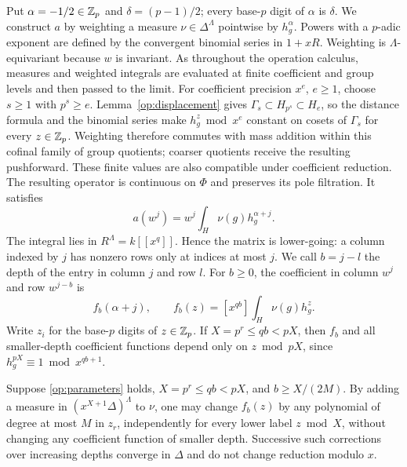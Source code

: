 Put $\alpha=-1/2\in\mathbb Z_p$ and $\delta=(p-1)/2$; every base-$p$ digit of
$\alpha$ is $\delta$. We construct $a$ by weighting a measure
$\nu\in\Delta^\Lambda$ pointwise by $h_g^\alpha$. Powers with a
$p$-adic exponent are defined by the convergent binomial series in
$1+xR$. Weighting is $\Lambda$-equivariant because $w$ is invariant.
As throughout the operation calculus, measures and weighted integrals
are evaluated at finite coefficient and group levels and then passed
to the limit. For coefficient precision $x^e$, $e\ge1$, choose
$s\ge1$ with $p^s\ge e$. Lemma~\ref{op:displacement} gives
$\Gamma_s\subset H_{p^s}\subset H_e$, so the distance formula and
the binomial series make $h_g^z\bmod x^e$ constant on cosets of
$\Gamma_s$ for every $z\in\mathbb Z_p$. Weighting therefore commutes with
mass addition within this cofinal family of group quotients; coarser
quotients receive the resulting pushforward. These finite values are
also compatible under coefficient reduction. The resulting operator
is continuous on $\Phi$ and preserves its pole filtration. It satisfies
\[
 a(w^j)=w^j\int_H\nu(g)h_g^{\alpha+j}.
\]
The integral lies in $R^\Lambda=k[[x^q]]$. Hence the matrix is
lower-going: a column indexed by $j$ has nonzero rows only at indices
at most $j$. We call $b=j-l$ the depth of the entry in column $j$ and
row $l$. For $b\ge0$, the coefficient in column $w^j$ and row
$w^{j-b}$ is
\begin{equation}
 f_b(\alpha+j),\qquad
 f_b(z)=[x^{qb}]\int_H\nu(g)h_g^z.
 \label{op:coefficients}
\end{equation}
Write $z_i$ for the base-$p$ digits of $z\in\mathbb Z_p$. If
$X=p^r\le qb<pX$, then $f_b$ and all smaller-depth coefficient
functions depend only on $z\bmod pX$, since
$h_g^{pX}\equiv1\bmod x^{qb+1}$.

\begin{lemma}
\label{op:coefficient-control}
Suppose \eqref{op:parameters} holds, $X=p^r\le qb<pX$, and
$b\ge X/(2M)$. By adding a measure in $(x^{X+1}\Delta)^\Lambda$ to
$\nu$, one may change $f_b(z)$ by any polynomial of degree at most
$M$ in $z_r$, independently for every lower label $z\bmod X$,
without changing any coefficient function of smaller depth.
Successive such corrections over increasing depths converge in $\Delta$
and do not change reduction modulo $x$.
\end{lemma}

